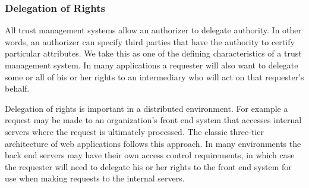 

\subsubsection{Delegation of Rights} All trust management systems allow an
authorizer to delegate authority. In other words, an authorizer can
specify third parties that have the authority to certify particular
attributes. We take this as one of the defining characteristics of a
trust management system.  In many applications a requester will also
want to delegate some or all of his or her rights to an intermediary
who will act on that requester's behalf.

Delegation of rights is important in a distributed environment. For
example a request may be made to an organization's front end system
that accesses internal servers where the request is ultimately
processed. The classic three-tier architecture of web applications
follows this approach.  In many environments the back end servers may
have their own access control requirements, in which case the
requester will need to delegate his or her rights to the front end
system for use when making requests to the internal servers.

